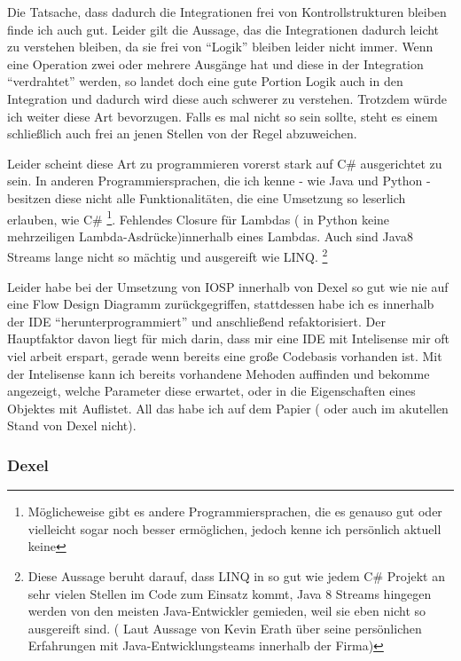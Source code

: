 Die Tatsache, dass dadurch die Integrationen frei von Kontrollstrukturen bleiben finde ich auch gut. 
Leider gilt die Aussage, das die Integrationen dadurch leicht zu verstehen bleiben, da sie frei von \enquote{Logik} bleiben leider nicht immer. Wenn eine Operation zwei oder mehrere Ausgänge hat und diese in der Integration \enquote{verdrahtet} werden, so landet doch eine gute Portion Logik auch in den Integration und dadurch wird diese auch schwerer zu verstehen. 
Trotzdem würde ich weiter diese Art bevorzugen. Falls es mal nicht so sein sollte, steht es einem schließlich auch frei an jenen Stellen von der Regel abzuweichen.


Leider scheint diese Art zu programmieren  vorerst stark auf C\# ausgerichtet zu sein. In anderen Programmiersprachen, die ich kenne - wie Java und Python - besitzen diese nicht alle Funktionalitäten, die eine Umsetzung so leserlich erlauben, wie C\# \footnote{Möglicheweise gibt es andere Programmiersprachen, die es genauso gut oder vielleicht sogar noch besser ermöglichen, jedoch kenne ich persönlich aktuell keine }.
Fehlendes Closure für Lambdas ( in Python keine mehrzeiligen Lambda-Asdrücke)innerhalb eines Lambdas. 
Auch sind Java8 Streams lange nicht so mächtig und ausgereift wie LINQ. \footnote{Diese Aussage beruht darauf, dass LINQ in so gut wie jedem C\# Projekt an sehr vielen Stellen im Code zum Einsatz kommt, Java 8 Streams hingegen werden von den meisten Java-Entwickler gemieden, weil sie eben nicht so ausgereift sind. ( Laut Aussage von Kevin Erath über seine persönlichen Erfahrungen mit Java-Entwicklungsteams innerhalb der Firma)}

Leider habe bei der Umsetzung von IOSP innerhalb von Dexel so gut wie nie auf eine Flow Design Diagramm zurückgegriffen, stattdessen habe ich es innerhalb der IDE \enquote{herunterprogrammiert} und anschließend refaktorisiert. Der Hauptfaktor davon liegt für mich darin, dass mir eine IDE mit Intelisense mir oft viel arbeit erspart, gerade wenn bereits eine große Codebasis vorhanden ist.
Mit der Intelisense kann ich bereits vorhandene Mehoden auffinden und bekomme angezeigt, welche Parameter diese erwartet, oder in die Eigenschaften eines Objektes mit Auflistet.
All das habe ich auf dem Papier ( oder auch im akutellen Stand von Dexel nicht).



\subsubsection{Dexel}

